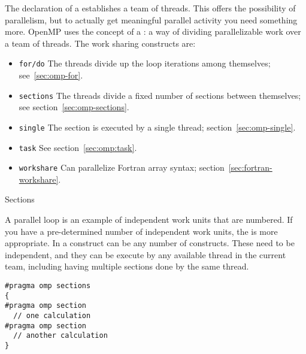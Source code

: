 
\label{sec:work-sharing}

The declaration of a  establishes a team of
threads. This offers the possibility of parallelism, but to actually
get meaningful parallel activity you need something more.
OpenMP uses the concept of a : a way of dividing parallelizable work over a team of threads.
The work sharing constructs are:
\begin{itemize}
\item \texttt{for/do} The threads divide up the loop iterations among
  themselves; see~\ref{sec:omp-for}.
\item \texttt{sections} The threads divide a fixed number of sections
  between themselves; see section~\ref{sec:omp-sections}.
\item \texttt{single} The section is executed by a single thread; section~\ref{sec:omp-single}.
\item \texttt{task} See section~\ref{sec:omp:task}.
\item \texttt{workshare} Can parallelize Fortran array syntax; section~\ref{sec:fortran-workshare}.
\end{itemize}

 {Sections}
\label{sec:omp-sections}

A parallel loop is an example of independent work units that are numbered.
If you have a pre-determined number of independent work units, 
the  is more appropriate. In a  construct
can be any number of  constructs. These need to be
independent, and they can be execute by any available thread in the current team,
including having multiple sections done by the same thread.
\begin{verbatim}
#pragma omp sections
{
#pragma omp section
  // one calculation
#pragma omp section
  // another calculation
}
\end{verbatim}

